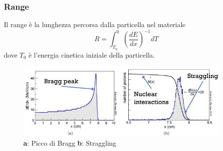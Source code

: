 \subsubsection*{Range}
Il range è la lunghezza percorsa dalla particella nel materiale \[R=\int_{T_0}^0 \left( \frac{dE}{dx} \right)^{-1} dT\] dove $T_0$ è l'energia cinetica iniziale della particella.

\begin{figure}[H]
    \centering
    \includegraphics[width=0.95\textwidth,frame]{Chapters/images/Interazione_radiazione_materia/image-20220214185815482.png}
    \captionsetup{width=0.95\linewidth}
    \caption{\textbf{a}: Picco di Bragg \quad \textbf{b}: Straggling }
    \label{fig:straggling}
\end{figure}


